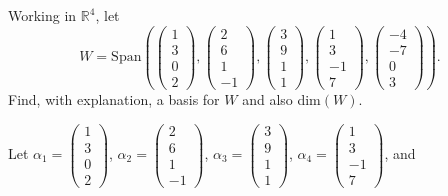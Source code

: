 \documentclass[12pt]{article}
\newenvironment{problem}[2][Problem]
{
	\begin{trivlist} 
		\item[\hskip \labelsep {\bfseries #1 #2:}]
	}
{
	\end{trivlist}
	}
\newenvironment{solution}[1][Solution]
{
	\begin{trivlist} 
		\item[\hskip \labelsep {\itshape #1:}]
	}
	{
	\end{trivlist}
}
\begin{document}
\newpage
\begin{problem}{3}
Working in $\mathbb{R}^4$, let
\[
W= \text{Span} \left( \begin{pmatrix} 1\\3\\0\\2 \end{pmatrix}, \begin{pmatrix} 2\\6\\1\\-1 \end{pmatrix}, \begin{pmatrix} 3\\9\\1\\1 \end{pmatrix}, \begin{pmatrix} 1\\3\\-1\\7 \end{pmatrix}, \begin{pmatrix} -4\\-7\\0\\3 \end{pmatrix} \right)\text{.}
\]
Find, with explanation, a basis for $W$ and also dim$(W)$.
\noindent
\newline
\newline
\begin{solution}
Let 
$\alpha_1 = \begin{pmatrix} 1\\3\\0\\2 \end{pmatrix}$,
$\alpha_2 = \begin{pmatrix} 2\\6\\1\\-1 \end{pmatrix}$,
$\alpha_3 = \begin{pmatrix} 3\\9\\1\\1 \end{pmatrix}$, 
$\alpha_4 = \begin{pmatrix} 1\\3\\-1\\7 \end{pmatrix}$, and

\end{solution}
\end{problem}
\end{document}
